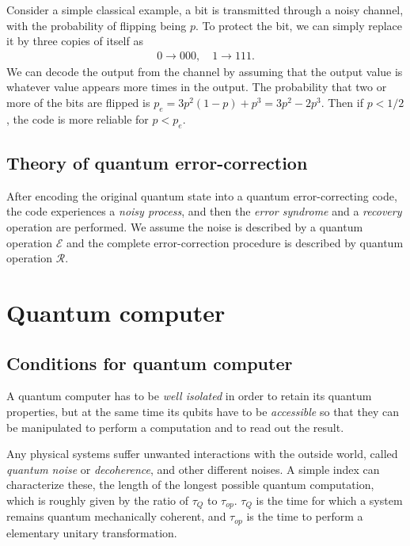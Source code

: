 \documentclass{article}
\begin{document}
Consider a simple classical example, a bit is transmitted through a noisy channel, with the probability of flipping being $p$. To protect the bit, we can simply replace it by three copies of itself as
\begin{align}
	0\rightarrow 000, \quad 1\rightarrow 111.
\end{align}
We can decode the output from the channel by assuming that the output value is whatever value appears more times in the output. 
The probability that two or more of the bits are flipped is $p_e=3p^2(1-p)+p^3=3p^2-2p^3$. Then if $p<1/2$, the code is more reliable for $p<p_e$.


\subsection{Theory of quantum error-correction}

After encoding the original quantum state into a quantum error-correcting code, the code experiences a \textit{noisy process}, and then the \textit{error syndrome} and a \textit{recovery} operation are performed. We assume the noise is described by a quantum operation $\mathcal{E}$ and the complete error-correction procedure is described by quantum operation $\mathcal{R}$.












\section{Quantum computer}

\subsection{Conditions for quantum computer}

A quantum computer has to be \textit{well isolated} in order to retain its quantum properties, but at the same time its qubits have to be \textit{accessible} so that they can be manipulated to perform a computation and to read out the result.

Any physical systems suffer unwanted interactions with the outside world, called \textit{quantum noise} or \textit{decoherence}, and other different noises. A simple index can characterize these, the length of the longest possible quantum computation, which is roughly given by the ratio of $\tau_Q$ to $\tau_{op}$. $\tau_Q$ is the time for which a system remains quantum mechanically coherent, and $\tau_{op}$ is the time to perform a elementary unitary transformation.
\end{document}
